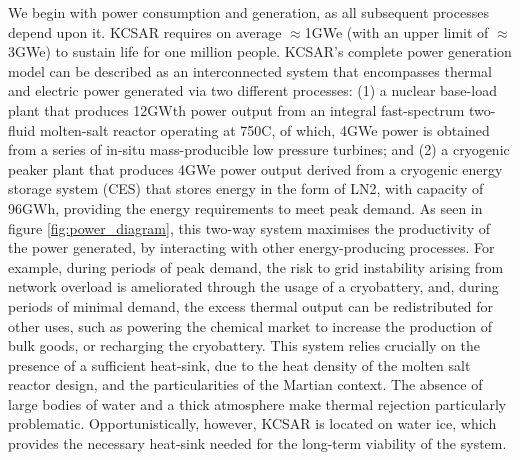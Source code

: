 \documentclass[fleqn,10pt]{Stylesheet} %
\begin{document}
We begin with power consumption and generation, as all subsequent processes depend upon it. KCSAR requires on average $\approx$1GWe (with an upper limit of $\approx$3GWe) to sustain life for one million people. KCSAR’s complete power generation model can be described as an interconnected system that encompasses thermal and electric power generated via two different processes: (1) a nuclear base-load plant that produces 12GWth power output from an integral fast-spectrum two-fluid molten-salt reactor operating at 750\degree{}C, of which, 4GWe power is obtained from a series of in-situ mass-producible low pressure turbines; and (2) a cryogenic peaker plant that produces 4GWe power output derived from a cryogenic energy storage system (CES) that stores energy in the form of LN2, with capacity of 96GWh, providing the energy requirements to meet peak demand. As seen in figure \ref{fig:power_diagram}, this two-way system maximises the productivity of the power generated, by interacting with other energy-producing processes. For example, during periods of peak demand, the risk to grid instability arising from network overload is ameliorated through the usage of a cryobattery, and, during periods of minimal demand, the excess thermal output can be redistributed for other uses, such as powering the chemical market to increase the production of bulk goods, or recharging the cryobattery. This system relies crucially on the presence of a sufficient heat-sink, due to the heat density of the molten salt reactor design, and the particularities of the Martian context. The absence of large bodies of water and a thick atmosphere make thermal rejection particularly problematic. Opportunistically, however, KCSAR is located on water ice, which provides the necessary heat-sink needed for the long-term viability of the system.
\end{document}
